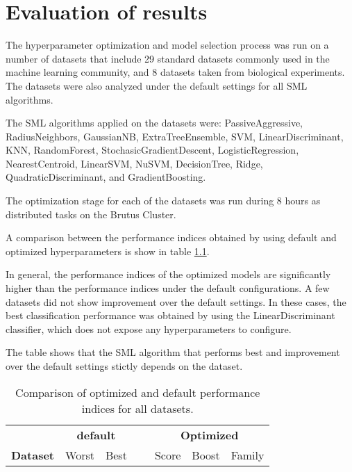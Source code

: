 \chapter{Evaluation of results}


The hyperparameter optimization and model selection process was run on a number of datasets that
include 29 standard datasets commonly used in the machine learning community, and 8 datasets taken from
biological experiments. The datasets were also analyzed under the default settings for all SML
algorithms.

The SML algorithms applied on the datasets were: PassiveAggressive, RadiusNeighbors, GaussianNB,
ExtraTreeEnsemble, SVM, LinearDiscriminant, KNN, RandomForest,
StochasicGradientDescent, LogisticRegression, NearestCentroid, 
LinearSVM, NuSVM, DecisionTree,
Ridge, QuadraticDiscriminant, and 
GradientBoosting.


The optimization stage for each of the datasets was run during 8 hours as distributed tasks on the
Brutus Cluster.

A comparison between the performance indices obtained by using default and optimized hyperparameters
is show in table \ref{tb:comparison_all}.

In general, the performance indices of the optimized models are significantly higher than the
performance indices under the default configurations. A few datasets did not show improvement over
the default settings. In these cases, the best classification performance was obtained by using the
LinearDiscriminant classifier, which does not expose any hyperparameters to configure.

The table shows that the SML algorithm that performs best and improvement over the default settings stictly
depends on the dataset.

%

\begin{table}[h!]
\centering
\begin{tabularx}{\textwidth}{l r r r r r l}
	& \multicolumn{2}{c}{\bf default} & ~ & \multicolumn{3}{c}{\bf Optimized}\\
	\cline{2-3}
	\cline{5-7}
{\bf Dataset} & Worst & Best & ~ & Score & Boost & Family\\
	\cline{1-7}
	
\end{tabularx}
\caption{Comparison of optimized and default performance indices for all datasets.}
\label{tb:comparison_all}
\end{table}

